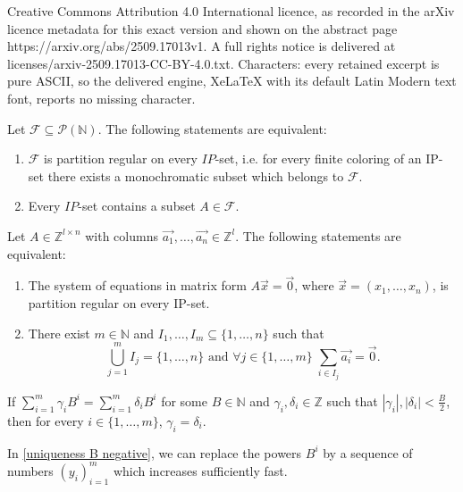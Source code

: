 \documentclass[10pt,a4paper]{amsart}
\newcommand{\FF}{\ensuremath{\mathcal{F}}}
\newcommand{\N}{\ensuremath{\mathbb{N}}}
\newcommand{\PP}{\ensuremath{\mathcal{P}}}
\newcommand{\Z}{\ensuremath{\mathbb{Z}}}
\newcommand{\abs}[1]{\left | #1 \right |}
\begin{document}
Creative Commons Attribution 4.0 International licence, as recorded in the arXiv licence metadata for this exact version and shown on the abstract page https://arxiv.org/abs/2509.17013v1. A full rights notice is delivered at licenses/arxiv-2509.17013-CC-BY-4.0.txt. Characters: every retained excerpt is pure ASCII, so the delivered engine, XeLaTeX with its default Latin Modern text font, reports no missing character.
\begin{lemma}\label{neat_fact}
    Let $\FF \subseteq \PP(\N)$. The following statements are equivalent:

    \begin{enumerate}
        \item $\FF$ is partition regular on every $IP$-set, i.e. for every finite coloring of an IP-set there exists a monochromatic subset which belongs to $\FF$.
        \item Every $IP$-set contains a subset $A \in \FF$.
    \end{enumerate}
\end{lemma}

\begin{theorem}\label{classification_regular_systems_IP}
    Let $A \in \Z^{l\times n}$ with columns $\Vec{a_1}, \ldots, \Vec{a_n} \in \Z^l$. The following statements are equivalent:
    \begin{enumerate}
        \item The system of equations in matrix form $A\Vec{x} = \Vec{0}$, where $\Vec{x}= (x_1,\ldots,x_n)$, is partition regular on every IP-set.
        \item There exist $m\in \N$ and $I_1, \ldots, I_m \subseteq \{1,\ldots,n\}$ such that 
        $$\bigcup_{j=1}^m I_j = \{1,\ldots,n\} \text{ and } \forall j \in \{1,\ldots,m\} \; \sum_{i \in I_j} \Vec{a_i} = \Vec{0}.$$
    \end{enumerate}
\end{theorem}

        \begin{lemma}\label{uniqueness B negative}
            If $\sum_{i=1}^{m} \gamma_i B^i = \sum_{i=1}^{m} \delta_i B^i$ for some $B\in \N$ and $\gamma_i, \delta_i \in \Z$ such that $\abs{\gamma_i},\abs{\delta_i} < \frac{B}{2}$, then for every $i \in \{1,\ldots,m\}$, $\gamma_i = \delta_i$.
        \end{lemma}

    \begin{remark}\label{sparse_enough}
        In \cref{uniqueness B negative}, we can replace the powers $B^i$ by a sequence of numbers $(y_i)_{i=1}^m$ which increases sufficiently fast.
    \end{remark}
\end{document}

